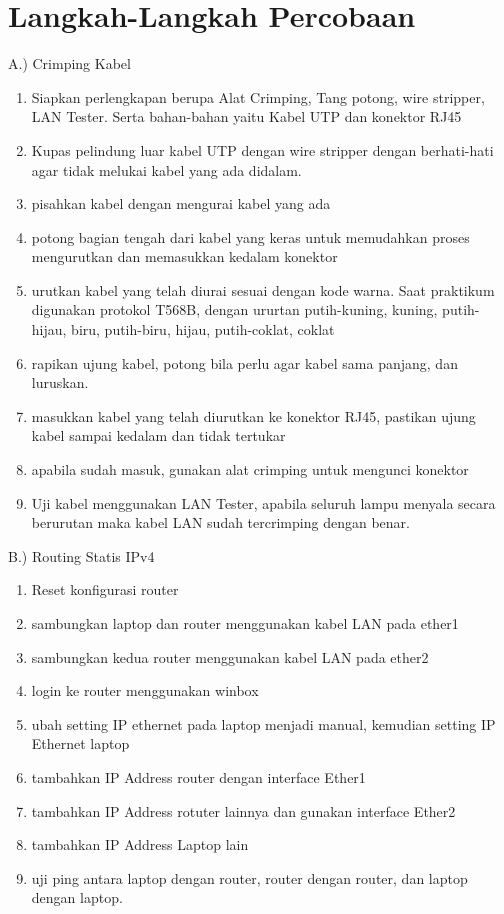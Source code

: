 \section{Langkah-Langkah Percobaan}
A.) Crimping Kabel
\begin{enumerate}
	\item Siapkan perlengkapan berupa Alat Crimping, Tang potong, wire stripper, LAN Tester. Serta bahan-bahan yaitu Kabel UTP dan konektor RJ45
	\item Kupas pelindung luar kabel UTP dengan wire stripper dengan berhati-hati agar tidak melukai kabel yang ada didalam.
	\item pisahkan kabel dengan mengurai kabel yang ada
	\item potong bagian tengah dari kabel yang keras untuk memudahkan proses mengurutkan dan memasukkan kedalam konektor
	\item urutkan kabel yang telah diurai sesuai dengan kode warna. Saat praktikum digunakan protokol T568B, dengan ururtan putih-kuning, kuning, putih-hijau, biru, putih-biru, hijau, putih-coklat, coklat
	\item rapikan ujung kabel, potong bila perlu agar kabel sama panjang, dan luruskan.
	\item masukkan kabel yang telah diurutkan ke konektor RJ45, pastikan ujung kabel sampai kedalam dan tidak tertukar
	\item apabila sudah masuk, gunakan alat crimping untuk mengunci konektor
	\item Uji kabel menggunakan LAN Tester, apabila seluruh lampu menyala secara berurutan maka kabel LAN sudah tercrimping dengan benar.
\end{enumerate}
B.) Routing Statis IPv4
\begin{enumerate}
	\item Reset konfigurasi router
	\item sambungkan laptop dan router menggunakan kabel LAN pada ether1
	\item sambungkan kedua router menggunakan kabel LAN pada ether2
	\item login ke router menggunakan winbox
	\item ubah setting IP ethernet pada laptop menjadi manual, kemudian setting IP Ethernet laptop
	\item tambahkan IP Address router dengan interface Ether1
	\item tambahkan IP Address rotuter lainnya dan gunakan interface Ether2
	\item tambahkan IP Address Laptop lain
	\item uji ping antara laptop dengan router, router dengan router, dan laptop dengan laptop.
\end{enumerate}
